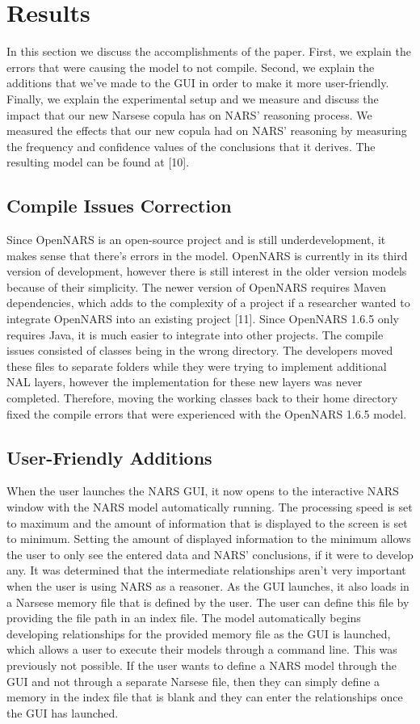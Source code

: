 \documentclass[conference]{IEEEtran}
\begin{document}
		
\section{Results}	
	In this section we discuss the accomplishments of the paper. First, we explain the errors that were causing the model to not compile. Second, we explain the additions that we've made to the GUI in order to make it more user-friendly. Finally, we explain the experimental setup and we measure and discuss the impact that our new Narsese copula has on NARS' reasoning process. We measured the effects that our new copula had on NARS' reasoning by measuring the frequency and confidence values of the conclusions that it derives. The resulting model can be found at [10].

\subsection{Compile Issues Correction}
	Since OpenNARS is an open-source project and is still underdevelopment, it makes sense that there's errors in the model. OpenNARS is currently in its third version of development, however there is still interest in the older version models because of their simplicity. The newer version of OpenNARS requires Maven dependencies, which adds to the complexity of a project if a researcher wanted to integrate OpenNARS into an existing project [11]. Since OpenNARS 1.6.5 only requires Java, it is much easier to integrate into other projects. The compile issues consisted of classes being in the wrong directory. The developers moved these files to separate folders while they were trying to implement additional NAL layers, however the implementation for these new layers was never completed. Therefore, moving the working classes back to their home directory fixed the compile errors that were experienced with the OpenNARS 1.6.5 model.

\subsection{User-Friendly Additions}
	When the user launches the NARS GUI, it now opens to the interactive NARS window with the NARS model automatically running. The processing speed is set to maximum and the amount of information that is displayed to the screen is set to minimum. Setting the amount of displayed information to the minimum allows the user to only see the entered data and NARS' conclusions, if it were to develop any. It was determined that the intermediate relationships aren't very important when the user is using NARS as a reasoner. As the GUI launches, it also loads in a Narsese memory file that is defined by the user. The user can define this file by providing the file path in an index file. The model automatically begins developing relationships for the provided memory file as the GUI is launched, which allows a user to execute their models through a command line. This was previously not possible. If the user wants to define a NARS model through the GUI and not through a separate Narsese file, then they can simply define a memory in the index file that is blank and they can enter the relationships once the GUI has launched.
	
\end{document}

